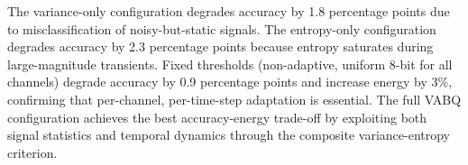 The variance-only configuration degrades accuracy by 1.8 percentage points due to misclassification of noisy-but-static signals. The entropy-only configuration degrades accuracy by 2.3 percentage points because entropy saturates during large-magnitude transients. Fixed thresholds (non-adaptive, uniform 8-bit for all channels) degrade accuracy by 0.9 percentage points and increase energy by 3\%, confirming that per-channel, per-time-step adaptation is essential. The full VABQ configuration achieves the best accuracy-energy trade-off by exploiting both signal statistics and temporal dynamics through the composite variance-entropy criterion.

